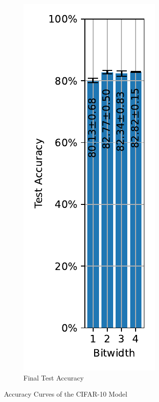 \begin{figure}[H]
\begin{subfigure}[H]{0.3\textwidth}
                \includegraphics[width=\textwidth]{../standard/CIFAR10/plots/cifar10_final_acc.pdf}
                \caption{Final Test Accuracy}
            \end{subfigure}
            \caption{Accuracy Curves of the CIFAR-10 Model}
        \end{figure}

